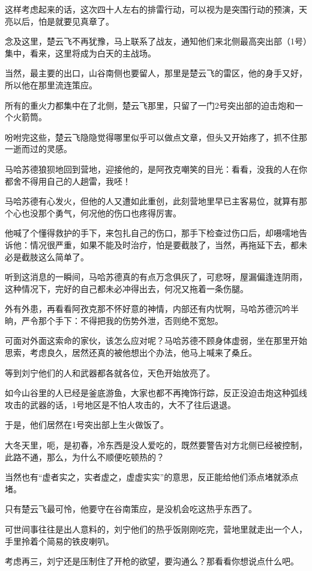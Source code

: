 这样考虑起来的话，这次四十人左右的排雷行动，可以视为是突围行动的预演，天亮以后，怕是就要见真章了。

念及这里，楚云飞不再犹豫，马上联系了战友，通知他们来北侧最高突出部（1号）集中，看来，这里将成为白天的主战场。

当然，最主要的出口，山谷南侧也要留人，那里是楚云飞的雷区，他的身手又好，所以他在那里流连策应。

所有的重火力都集中在了北侧，楚云飞那里，只留了一门2号突出部的迫击炮和一个火箭筒。

吩咐完这些，楚云飞隐隐觉得哪里似乎可以做点文章，但头又开始疼了，抓不住那一逝而过的灵感。

马哈苏德狼狈地回到营地，迎接他的，是阿孜克嘲笑的目光：看看，没我的人在你都舍不得用自己的人趟雷，我呸！

马哈苏德有心发火，但他的人又遭如此重创，此刻营地里早已主客易位，就算有那个心也没那个勇气，何况他的伤口也疼得厉害。

他喊了个懂得救护的手下，来包扎自己的伤口，那手下检查过伤口后，却嗫嚅地告诉他：情况很严重，如果不能及时治疗，怕是要截肢了，当然，再拖延下去，都未必是截肢这么简单了。

听到这消息的一瞬间，马哈苏德真的有点万念俱灰了，可悲呀，屋漏偏逢连阴雨，这种情况下，完好的自己都未必冲得出去，何况又拖着一条伤腿。

外有外患，再看看阿孜克那不怀好意的神情，内部还有内忧啊，马哈苏德沉吟半晌，严令那个手下：不得把我的伤势外泄，否则绝不宽恕。

可面对外面这索命的家伙，该怎么应对呢？马哈苏德不顾身体虚弱，坐在那里开始思索，考虑良久，居然还真的被他想出个办法，他马上喊来了桑丘。

等到刘宁他们的人和武器都各就各位，天色开始放亮了。

如今山谷里的人已经是釜底游鱼，大家也都不再掩饰行踪，反正没迫击炮这种弧线攻击的武器的话，1号地区是不怕人攻击的，大不了往后退退。

于是，他们居然在1号突出部上生火做饭了。

大冬天里，呃，是初春，冷东西是没人爱吃的，既然要警告对方北侧已经被控制，此路不通，那么，为什么不顺便吃顿热的？

当然也有“虚者实之，实者虚之，虚虚实实”的意思，反正能给他们添点堵就添点堵。

只有楚云飞最可怜，他要守在谷南策应，是没机会吃这热乎东西了。

可世间事往往是出人意料的，刘宁他们的热乎饭刚刚吃完，营地里就走出一个人，手里拎着个简易的铁皮喇叭。

考虑再三，刘宁还是压制住了开枪的欲望，要沟通么？那看看你想说点什么吧。

